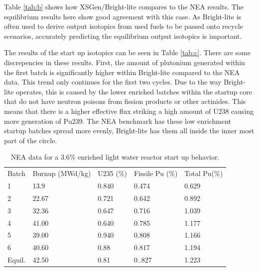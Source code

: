 \documentclass{article}
\begin{document}
Table \ref{tab:b} shows how XSGen/Bright-lite compares to the NEA results. The equilibrium results here show good agreement with this case. As Bright-lite is often used to derive output isotopics from used fuels to be passed onto recycle scenarios, accurately predicting the equilibrium output isotopics is important.

The results of the start up isotopics can be seen in Table \ref{tab:c}. There are some discrepencies in these results. First, the amount of plutonium generated within the first batch is significantly higher within Bright-lite compared to the NEA data. This trend only continues for the first two cycles. Due to the way Bright-lite operates, this is caused by the lower enriched batches within the startup core that do not have neutron poisons from fission products or other actinides. This means that there is a higher effective flux striking a high amount of U238 causing more generation of Pu239. The NEA benchmark has these low enrichment startup batches spread more evenly, Bright-lite has them all inside the inner most part of the circle.

\begin{table}[!htb]
\centering
\caption{NEA data for a 3.6\% enriched light water reactor start up behavior.}
\label{tab:d}
\begin{tabular}{lllll}
Batch & Burnup (MWd/kg) & U235 (\%) & Fissile Pu (\%) & Total Pu(\%) \\
1 & 13.9 & 0.840 & 0.474 & 0.629 \\
2 & 22.67 & 0.721 & 0.642 & 0.892 \\
3 & 32.36 & 0.647 & 0.716 & 1.039 \\
4 & 41.00 & 0.640 & 0.785 & 1.177 \\
5 & 39.00 & 0.940 & 0.808 & 1.166 \\
6 & 40.60 & 0.88 & 0.817 & 1.194 \\
Equil. & 42.50 & 0.81 & 0..827 & 1.223
\end{tabular}
\end{table}
\end{document}
